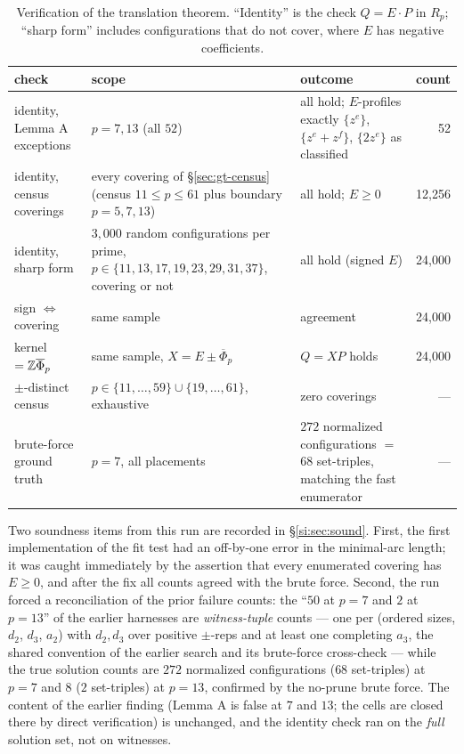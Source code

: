\begin{table}[t]
\centering
\small
\caption{Verification of the translation theorem. ``Identity'' is the check
$Q=E\cdot P$ in $R_p$; ``sharp form'' includes configurations that do not
cover, where $E$ has negative coefficients.}
\label{tab:gtverify}
\begin{tabularx}{\textwidth}{@{}lXXr@{}}
\toprule
check & scope & outcome & count \\
\midrule
identity, Lemma A exceptions & $p=7,13$ (all $52$) & all hold; $E$-profiles
exactly $\{z^e\}$, $\{z^e{+}z^f\}$, $\{2z^e\}$ as classified & 52 \\
identity, census coverings & every covering of \S\ref{sec:gt-census}
(census $11\le p\le 61$ plus boundary $p=5,7,13$) & all hold; $E\ge 0$ & 12{,}256 \\
identity, sharp form & $3{,}000$ random configurations per prime, $p\in\{11,
13,17,19,23,29,31,37\}$, covering or not & all hold (signed $E$) & 24{,}000 \\
sign $\Leftrightarrow$ covering & same sample & agreement & 24{,}000 \\
kernel $=\mathbb{Z}\overline\Phi_p$ & same sample, $X=E\pm\overline\Phi_p$ &
$Q=XP$ holds & 24{,}000 \\
$\pm$-distinct census & $p\in\{11,\dots,59\}\cup\{19,\dots,61\}$, exhaustive
& zero coverings & --- \\
brute-force ground truth & $p=7$, all placements & $272$ normalized
configurations $=$ $68$ set-triples, matching the fast enumerator & --- \\
\bottomrule
\end{tabularx}
\end{table}

Two soundness items from this run are recorded in \S\ref{si:sec:sound}. First,
the first implementation of the fit test had an off-by-one error in the
minimal-arc length; it was caught immediately by the assertion that every
enumerated covering has $E\ge 0$, and after the fix all counts agreed with
the brute force. Second, the run forced a reconciliation of the prior
failure counts: the ``$50$ at $p=7$ and $2$ at $p=13$'' of the earlier
harnesses are \emph{witness-tuple} counts --- one per (ordered sizes,
$d_2$, $d_3$, $a_2$) with $d_2,d_3$ over positive $\pm$-reps and at least
one completing $a_3$, the shared convention of the earlier search and its
brute-force cross-check --- while the true solution counts are $272$
normalized configurations ($68$ set-triples) at $p=7$ and $8$
($2$ set-triples) at $p=13$, confirmed by the no-prune brute force. The
content of the earlier finding (Lemma A is false at $7$ and $13$; the cells
are closed there by direct verification) is unchanged, and the identity
check ran on the \emph{full} solution set, not on witnesses.

